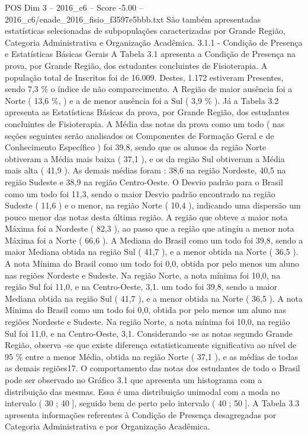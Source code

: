 \begin{textsample}{POS Dim 3 – 2016\_c6 – Score -5.00 – 2016\_c6/enade\_2016\_fisio\_f3597e5bbb.txt}
São também apresentadas estatísticas selecionadas de subpopulações caracterizadas por Grande Região, Categoria Administrativa e Organização Acadêmica. 3.1.1 - Condição de Presença e Estatísticas Básicas Gerais A Tabela 3.1 apresenta a Condição de Presença na prova, por Grande Região, dos estudantes concluintes de Fisioterapia.
A população total de Inscritos foi de 16.009.
Destes, 1.172 estiveram Presentes, sendo 7,3 \% o índice de não comparecimento.
A Região de maior ausência foi a Norte ( 13,6 \%, ) e a de menor ausência foi a Sul ( 3,9 \% ).
Já a Tabela 3.2 apresenta as Estatísticas Básicas da prova, por Grande Região, dos estudantes concluintes de Fisioterapia.
A Média das notas da prova como um todo ( nas seções seguintes serão analisados os Componentes de Formação Geral e de Conhecimento Específico ) foi 39,8, sendo que os alunos da região Norte obtiveram a Média mais baixa ( 37,1 ), e os da região Sul obtiveram a Média mais alta ( 41,9 ).
As demais médias foram : 38,6 na região Nordeste, 40,5 na região Sudeste e 38,9 na região Centro-Oeste.
O Desvio padrão para o Brasil como um todo foi 11,3, sendo o maior Desvio padrão encontrado na região Sudeste ( 11,6 ) e o menor, na região Norte ( 10,4 ), indicando uma dispersão um pouco menor das notas desta última região.
A região que obteve a maior nota Máxima foi a Nordeste ( 82,3 ), ao passo que a região que atingiu a menor nota Máxima foi a Norte ( 66,6 ).
A Mediana do Brasil como um todo foi 39,8, sendo a maior Mediana obtida na região Sul ( 41,7 ), e a menor obtida na Norte ( 36,5 ).
A nota Mínima do Brasil como um todo foi 0,0, obtida por pelo menos um aluno nas regiões Nordeste e Sudeste.
Na região Norte, a nota mínima foi 10,0, na região Sul foi 11,0, e na Centro-Oeste, 3,1. um todo foi 39,8, sendo a maior Mediana obtida na região Sul ( 41,7 ), e a menor obtida na Norte ( 36,5 ).
A nota Mínima do Brasil como um todo foi 0,0, obtida por pelo menos um aluno nas regiões Nordeste e Sudeste.
Na região Norte, a nota mínima foi 10,0, na região Sul foi 11,0, e na Centro-Oeste, 3,1.
Considerando -se as notas segundo Grande Região, observa -se que existe diferença estatisticamente significativa ao nível de 95 \% entre a menor Média, obtida na região Norte ( 37,1 ), e as médias de todas as demais regiões17.
O comportamento das notas dos estudantes de todo o Brasil pode ser observado no Gráfico 3.1 que apresenta um histograma com a distribuição das mesmas.
Essa é uma distribuição unimodal com a moda no intervalo ( 30 ; 40 ], seguido bem de perto pelo intervalo ( 40 ; 50 ].
A Tabela 3.3 apresenta informações referentes à Condição de Presença desagregadas por Categoria Administrativa e por Organização Acadêmica.

\end{textsample}
